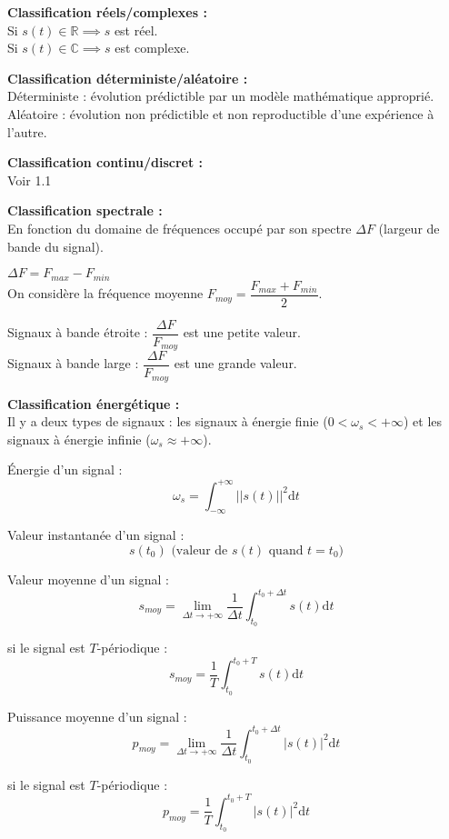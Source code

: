 \documentclass[a4paper,12pt]{report}
\begin{document}
\textbf{Classification réels/complexes :} \\
Si $s(t) \in \mathbb{R} \implies s$ est réel. \\
Si $s(t) \in \mathbb{C} \implies s$ est complexe.

\textbf{Classification déterministe/aléatoire :} \\
Déterministe : évolution prédictible par un modèle mathématique approprié. \\
Aléatoire : évolution non prédictible et non reproductible d'une expérience à l'autre.

\textbf{Classification continu/discret :} \\
Voir 1.1

\textbf{Classification spectrale :} \\
En fonction du domaine de fréquences occupé par son spectre $\Delta F$ (largeur de bande du signal).

$\Delta F = F_{max} - F_{min}$ \\
On considère la fréquence moyenne $F_{moy} = \dfrac{F_{max} + F_{min}}{2}$.

Signaux à bande étroite : $\dfrac{\Delta F}{F_{moy}}$ est une petite valeur. \\
Signaux à bande large : $\dfrac{\Delta F}{F_{moy}}$ est une grande valeur.

\textbf{Classification énergétique :} \\
Il y a deux types de signaux : les signaux à énergie finie ($0 < \omega _{s} < +\infty$) et les signaux à énergie infinie ($\omega _{s} \approx +\infty$).

\begin{defi}
    \'Energie d'un signal :
    \[ \omega _{s} = \int_{-\infty}^{+\infty} ||s(t)||^2 \mathrm{d}t \]

    Valeur instantanée d'un signal :
    \[ s(t_{0}) \text{ (valeur de }s(t) \text{ quand } t=t_{0}\text{)} \]
\end{defi}

\begin{defi}
    Valeur moyenne d'un signal :
    \[ s_{moy} = \lim_{\Delta t \to +\infty} \dfrac{1}{\Delta t} \int_{t_{0}}^{t_{0}+\Delta t} s(t) \mathrm{d}t \]

    si le signal est $T$-périodique :
    \[ s_{moy} = \dfrac{1}{T} \int_{t_{0}}^{t_{0}+T} s(t) \mathrm{d}t \]
\end{defi}

\begin{defi}
    Puissance moyenne d'un signal :
    \[ p_{moy} = \lim_{\Delta t \to +\infty} \dfrac{1}{\Delta t} \int_{t_{0}}^{t_{0}+\Delta t} |s(t)|^{2} \mathrm{d}t \]

    si le signal est $T$-périodique :
    \[ p_{moy} = \dfrac{1}{T} \int_{t_{0}}^{t_{0}+T} |s(t)|^{2} \mathrm{d}t \]
\end{defi}
\end{document}
